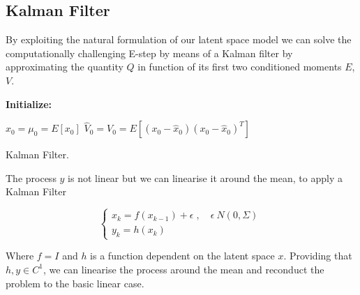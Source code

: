 \documentclass[
	11pt, %
]{beamer}
\begin{document}
\subsection{Kalman Filter}
\begin{frame}
 By exploiting the natural formulation of our latent space model we can solve the computationally challenging E-step by means of a Kalman filter by approximating the quantity $Q$ in function of its first two conditioned moments $E$, $V$. 
\end{frame}

%
%
%
%


\begin{frame}

\begin{algorithm}[H]

\textbf{Initialize: }
\begin{substeps}
$\hat{x}_0 = \mu_0 = E[x_0]$ \;
$\hat{V}_0 = V_0 = E[(x_0-\hat{x}_0)(x_0-\hat{x}_0)^T]$  \;
\end{substeps}
\caption{Kalman Filter.}
\label{algo:rem_latent}
\end{algorithm}

\end{frame}


\begin{frame}
The process $y$ is not linear but we can linearise it around the mean, to apply a Kalman Filter

\begin{equation}
    \begin{cases}
      x_k = f(x_{k-1}) + \epsilon \; , \quad \epsilon ~ N(0, \Sigma) \\
      y_k = h(x_k) 
    \end{cases}\,
\end{equation}

Where $f = I$ and $h$ is a function dependent on the latent space $x$. Providing that $h, y \in C^1$, we can linearise the process around the mean and reconduct the problem to the basic linear case.
\end{frame}
\end{document}
